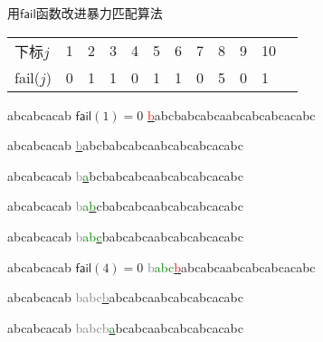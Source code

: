 \documentclass{ctexbeamer}
\newcommand{\ul}[1]{\underline{#1}}
\newcommand{\red}[1]{\textcolor{red}{#1}}
\newcommand{\green}[1]{\textcolor{green}{#1}}
\newcommand{\gray}[1]{\textcolor{gray}{#1}}
\newcommand{\str}[1]{\texttt{#1}}
\newcommand{\fail}{\mathsf{fail}}
\newcommand{\ugrn}[1]{\underline{\green{#1}}}
\newcommand{\ured}[1]{\underline{\red{#1}}}
\begin{document}
\begin{frame}[fragile]{用$\fail$函数改进暴力匹配算法}

\begin{table}[]
\begin{tabular}{llllllllllll}
下标$j$ & 1  & 2  & 3 & 4 & 5 & 6 & 7 & 8 & 9 & 10 \\
fail($j$) & 0  & 1  & 1 & 0 & 1 & 1 & 0 & 5  & 0  & 1
\end{tabular}
\end{table}

\begin{minipage}[t]{0.33\textwidth}

\begin{tverb}[fontsize=\tiny]
abcabcacab \(\scriptstyle\fail(1)=0\)
\ured{b}abcbabcabcaabcabcabcacabc
\end{tverb}

\begin{tverb}[fontsize=\tiny]
 abcabcacab
\ul{\gray{b}}abcbabcabcaabcabcabcacabc
\end{tverb}

\begin{tverb}[fontsize=\tiny]
 abcabcacab
\gray{b}\ugrn{a}bcbabcabcaabcabcabcacabc
\end{tverb}

\begin{tverb}[fontsize=\tiny]
 abcabcacab
\gray{b}\green{a}\ugrn{b}cbabcabcaabcabcabcacabc
\end{tverb}

\begin{tverb}[fontsize=\tiny]
 abcabcacab
\gray{b}\green{ab}\ugrn{c}babcabcaabcabcabcacabc
\end{tverb}

\begin{tverb}[fontsize=\tiny]
 abcabcacab \(\scriptstyle\fail(4)=0\)
\gray{b}\green{abc}\ul{\red{b}}abcabcaabcabcabcacabc
\end{tverb}

\begin{tverb}[fontsize=\tiny]
     abcabcacab
\gray{babc}\ul{\gray{b}}abcabcaabcabcabcacabc
\end{tverb}

\begin{tverb}[fontsize=\tiny]
     abcabcacab
\gray{babcb}\ugrn{a}bcabcaabcabcabcacabc
\end{tverb}


\end{minipage}
\end{frame}
\end{document}
